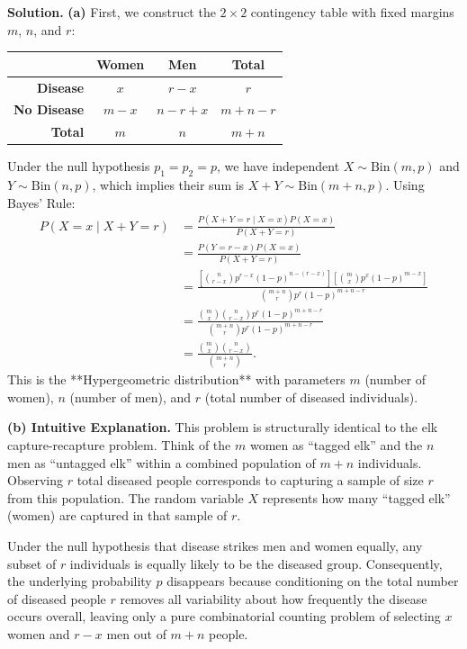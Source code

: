 \documentclass[11pt,a4paper]{article}
\begin{document}
\noindent \textbf{Solution.} \textbf{(a)} First, we construct the $2 \times 2$ contingency table with fixed margins $m$, $n$, and $r$:
\begin{center}
\begin{tabular}{r|cc|c}
 & \textbf{Women} & \textbf{Men} & \textbf{Total} \\
\hline
\textbf{Disease} & $x$ & $r - x$ & $r$ \\
\textbf{No Disease} & $m - x$ & $n - r + x$ & $m + n - r$ \\
\hline
\textbf{Total} & $m$ & $n$ & $m + n$
\end{tabular}
\end{center}
Under the null hypothesis $p_1 = p_2 = p$, we have independent $X \sim \text{Bin}(m, p)$ and $Y \sim \text{Bin}(n, p)$, which implies their sum is $X + Y \sim \text{Bin}(m+n, p)$. Using Bayes' Rule:
\begin{align*}
P(X = x \mid X + Y = r) &= \frac{P(X + Y = r \mid X = x) P(X = x)}{P(X + Y = r)} \\
&= \frac{P(Y = r - x) P(X = x)}{P(X + Y = r)} \\
&= \frac{\left[ \binom{n}{r-x} p^{r-x} (1-p)^{n-(r-x)} \right] \left[ \binom{m}{x} p^x (1-p)^{m-x} \right]}{\binom{m+n}{r} p^r (1-p)^{m+n-r}} \\
&= \frac{\binom{m}{x} \binom{n}{r-x} p^r (1-p)^{m+n-r}}{\binom{m+n}{r} p^r (1-p)^{m+n-r}} \\
&= \frac{\binom{m}{x} \binom{n}{r-x}}{\binom{m+n}{r}}.
\end{align*}
This is the **Hypergeometric distribution** with parameters $m$ (number of women), $n$ (number of men), and $r$ (total number of diseased individuals).

\vspace{4pt}
\noindent \textbf{(b) Intuitive Explanation.} This problem is structurally identical to the elk capture-recapture problem. Think of the $m$ women as ``tagged elk'' and the $n$ men as ``untagged elk'' within a combined population of $m + n$ individuals. Observing $r$ total diseased people corresponds to capturing a sample of size $r$ from this population. The random variable $X$ represents how many ``tagged elk'' (women) are captured in that sample of $r$. 

Under the null hypothesis that disease strikes men and women equally, any subset of $r$ individuals is equally likely to be the diseased group. Consequently, the underlying probability $p$ disappears because conditioning on the total number of diseased people $r$ removes all variability about how frequently the disease occurs overall, leaving only a pure combinatorial counting problem of selecting $x$ women and $r-x$ men out of $m+n$ people.
\end{document}
